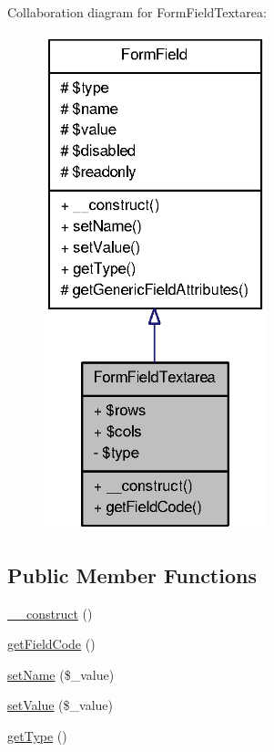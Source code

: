 Collaboration diagram for FormFieldTextarea:\nopagebreak
\begin{figure}[H]
\begin{center}
\leavevmode
\includegraphics[width=184pt]{classFormFieldTextarea__coll__graph}
\end{center}
\end{figure}
\subsection*{Public Member Functions}
\begin{DoxyCompactItemize}
\item 
\hyperlink{classFormFieldTextarea_a65e5d308db60f1ca0d08085d09dea8bc}{\_\-\_\-construct} ()
\item 
\hyperlink{classFormFieldTextarea_aebe84c54cafbcc8b4fc32f4b5ce04f1a}{getFieldCode} ()
\item 
\hyperlink{classFormField_ad57e32bd53170af060e869b3b60f0ef7}{setName} (\$\_\-value)
\item 
\hyperlink{classFormField_a465ff61e290d82be96bb793c3a14b3e7}{setValue} (\$\_\-value)
\item 
\hyperlink{classFormField_a1f64b737bccb6b2827f8c5665b9920c7}{getType} ()
\end{DoxyCompactItemize}
